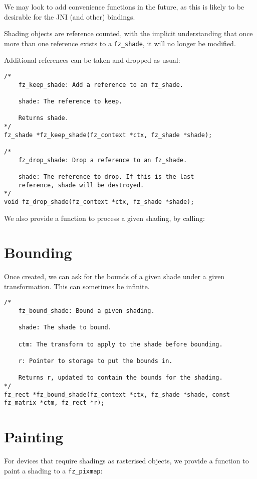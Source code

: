 \documentclass[oneside]{book}
\begin{document}
We may look to add convenience functions in the future, as this is likely to be desirable for the JNI (and other) bindings.

Shading objects are reference counted, with the implicit understanding that once more than one reference exists to a \texttt{fz\_shade}, it will no longer be modified.

Additional references can be taken and dropped as usual:

\begin{lstlisting}
/*
	fz_keep_shade: Add a reference to an fz_shade.

	shade: The reference to keep.

	Returns shade.
*/
fz_shade *fz_keep_shade(fz_context *ctx, fz_shade *shade);

/*
	fz_drop_shade: Drop a reference to an fz_shade.

	shade: The reference to drop. If this is the last
	reference, shade will be destroyed.
*/
void fz_drop_shade(fz_context *ctx, fz_shade *shade);
\end{lstlisting}


We also provide a function to process a given shading, by calling:

\section{Bounding}

Once created, we can ask for the bounds of a given shade under a given transformation. This can sometimes be infinite.

\begin{lstlisting}
/*
	fz_bound_shade: Bound a given shading.

	shade: The shade to bound.

	ctm: The transform to apply to the shade before bounding.

	r: Pointer to storage to put the bounds in.

	Returns r, updated to contain the bounds for the shading.
*/
fz_rect *fz_bound_shade(fz_context *ctx, fz_shade *shade, const fz_matrix *ctm, fz_rect *r);
\end{lstlisting}

\section{Painting}

For devices that require shadings as rasterised objects, we provide a function to paint a shading to a \texttt{fz\_pixmap}:
\end{document}
